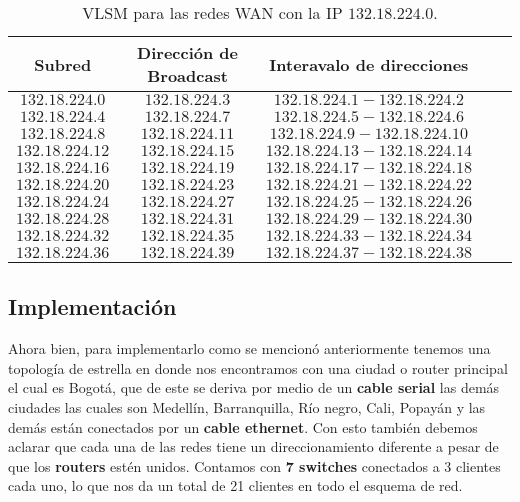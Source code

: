 \begin{table}[ht]
\centering
\caption{VLSM para las redes WAN con la IP \(132.18.224.0\).}
\begin{tabular}[t]{ccccc}
\toprule
\color{EAFIT-blue}\textbf{Subred}&\color{EAFIT-blue}\textbf{Dirección de Broadcast}&\color{EAFIT-blue}\textbf{Interavalo de direcciones}\\
\midrule
\(132.18.224.0\)&\(132.18.224.3\)&\(132.18.224.1 - 132.18.224.2\)\\
\(132.18.224.4\)&\(132.18.224.7\)&\(132.18.224.5 - 132.18.224.6\)\\
\(132.18.224.8\)&\(132.18.224.11\)&\(132.18.224.9 - 132.18.224.10\)\\
\(132.18.224.12\)&\(132.18.224.15\)&\(132.18.224.13 - 132.18.224.14\)\\
\(132.18.224.16\)&\(132.18.224.19\)&\(132.18.224.17 - 132.18.224.18\)\\
\(132.18.224.20\)&\(132.18.224.23\)&\(132.18.224.21 - 132.18.224.22\)\\
\(132.18.224.24\)&\(132.18.224.27\)&\(132.18.224.25 - 132.18.224.26\)\\
\(132.18.224.28\)&\(132.18.224.31\)&\(132.18.224.29 - 132.18.224.30\)\\
\(132.18.224.32\)&\(132.18.224.35\)&\(132.18.224.33 - 132.18.224.34\)\\
\(132.18.224.36\)&\(132.18.224.39\)&\(132.18.224.37 - 132.18.224.38\)\\
\bottomrule
\end{tabular}
\label{table: VLSM WAN}
\end{table}

\newpage
\subsection{Implementación}

Ahora bien, para implementarlo como se mencionó anteriormente tenemos una
topología de estrella en donde nos encontramos con una ciudad o router
principal el cual es Bogotá, que de este se deriva por medio de un
\textbf{cable serial} las demás ciudades las cuales son Medellín, Barranquilla,
Río negro, Cali, Popayán y las demás están conectados por un
\textbf{cable ethernet}. Con esto también debemos aclarar que cada una de las
redes tiene un direccionamiento diferente a pesar de que los \textbf{routers}
estén unidos. Contamos con \textbf{7 switches} conectados a 3 clientes cada uno,
lo que nos da un total de 21 clientes en todo el esquema de red.
\\

